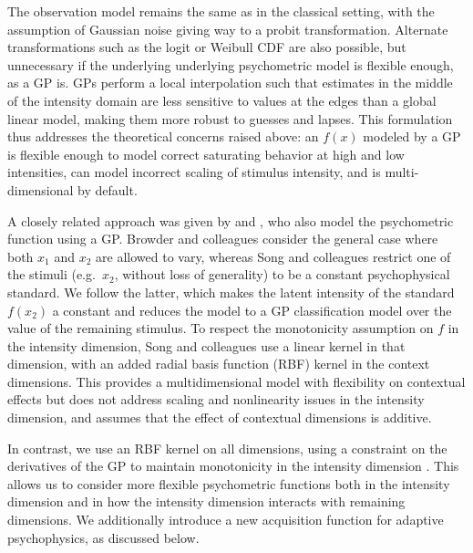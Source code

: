\documentclass[../main.tex]{subfiles}
\begin{document}
The observation model remains the same as in the classical setting, with the assumption of Gaussian noise giving way to a probit transformation. Alternate transformations such as the logit or Weibull CDF are also possible, but unnecessary if the underlying underlying psychometric model is flexible enough, as a GP is. GPs perform a local interpolation such that estimates in the middle of the intensity domain are less sensitive to values at the edges than a global linear model, making them more robust to guesses and lapses. This formulation thus addresses the theoretical concerns raised above: an $f(x)$ modeled by a GP is flexible enough to model correct saturating behavior at high and low intensities, can model incorrect scaling of stimulus intensity, and is multi-dimensional by default.

A closely related approach was given by \citet{Song2018} and \citet{Browder2019}, who also model the psychometric function using a GP. Browder and colleagues consider the general case where both $x_1$ and $x_2$ are allowed to vary, whereas Song and colleagues restrict one of the stimuli (e.g.\ $x_2$, without loss of generality) to be a constant psychophysical standard. We follow the latter, which makes the latent intensity of the standard $f(x_2)$ a constant and reduces the model to a GP classification model over the value of the remaining stimulus. To respect the monotonicity assumption on $f$ in the intensity dimension, Song and colleagues use a linear kernel in that dimension, with an added radial basis function (RBF) kernel in the context dimensions. This provides a multidimensional model with flexibility on contextual effects but does not address scaling and nonlinearity issues in the intensity dimension, and assumes that the effect of contextual dimensions is additive.

In contrast, we use an RBF kernel on all dimensions, using a constraint on the derivatives of the GP to maintain monotonicity in the intensity dimension \citep{Riihimaki2010}. This allows us to consider more flexible psychometric functions both in the intensity dimension and in how the intensity dimension interacts with remaining dimensions. We additionally introduce a new acquisition function for adaptive psychophysics, as discussed below.
\end{document}
